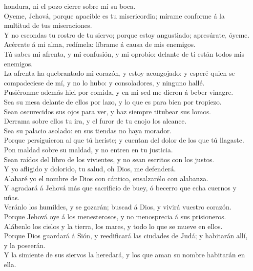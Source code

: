 hondura, ni el pozo cierre sobre mí su boca.\\
 Oyeme, Jehová, porque apacible es tu misericordia; mírame
conforme á la multitud de tus miseraciones.\\
 Y no escondas tu rostro de tu siervo; porque estoy
angustiado; apresúrate, óyeme.\\
 Acércate á mi alma, redímela: líbrame á causa de mis
enemigos.\\
 Tú sabes mi afrenta, y mi confusión, y mi oprobio: delante
de ti están todos mis enemigos.\\
 La afrenta ha quebrantado mi corazón, y estoy acongojado:
y esperé quien se compadeciese de mí, y no lo hubo: y consoladores, y
ninguno hallé.\\
 Pusiéronme además hiel por comida, y en mi sed me dieron á
beber vinagre.\\
 Sea su mesa delante de ellos por lazo, y lo que es para
bien por tropiezo.\\
 Sean oscurecidos sus ojos para ver, y haz siempre titubear
sus lomos.\\
 Derrama sobre ellos tu ira, y el furor de tu enojo los
alcance.\\
 Sea su palacio asolado: en sus tiendas no haya morador.\\
 Porque persiguieron al que tú heriste; y cuentan del dolor
de los que tú llagaste.\\
 Pon maldad sobre su maldad, y no entren en tu justicia.\\
 Sean raídos del libro de los vivientes, y no sean escritos
con los justos.\\
 Y yo afligido y dolorido, tu salud, oh Dios, me
defenderá.\\
 Alabaré yo el nombre de Dios con cántico, ensalzarélo con
alabanza.\\
 Y agradará á Jehová más que sacrificio de buey, ó becerro
que echa cuernos y uñas.\\
 Veránlo los humildes, y se gozarán; buscad á Dios, y
vivirá vuestro corazón.\\
 Porque Jehová oye á los menesterosos, y no menosprecia á
sus prisioneros.\\
 Alábenlo los cielos y la tierra, los mares, y todo lo que
se mueve en ellos.\\
 Porque Dios guardará á Sión, y reedificará las ciudades de
Judá; y habitarán allí, y la poseerán.\\
 Y la simiente de sus siervos la heredará, y los que aman
su nombre habitarán en ella.

